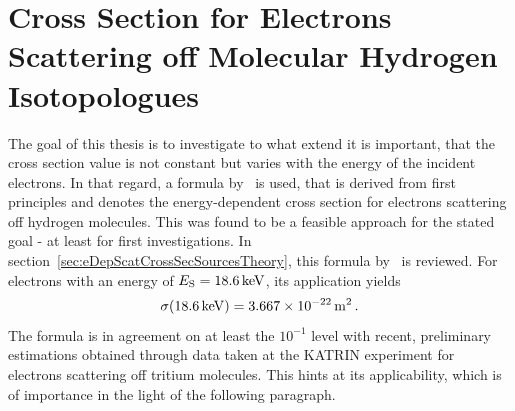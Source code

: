 \section{Cross Section for Electrons Scattering off Molecular Hydrogen Isotopologues}
\label{sec:eDepScatCrossSecSources}
The goal of this thesis is to investigate to what extend it is important, that the cross section value is not constant but varies with the energy of the incident electrons. In that regard, a formula by~\cite{Liu1987} is used, that is derived from first principles and denotes the energy-dependent cross section for electrons scattering off hydrogen molecules. This was found to be a feasible approach for the stated goal - at least for first investigations. In section~\ref{sec:eDepScatCrossSecSourcesTheory}, this formula by~\cite{Liu1987} is reviewed. For electrons with an energy of $E_\mathrm{S}=\SI{18.6}{keV}$, its application yields 
\begin{equation}
	\label{eq:eDepScatCrossSecSourcesCrossSecLiuAtEndpoint}
	\sigma(\SI{18.6}{keV}) = \SI{3.667e-22}{m^2}
	\text{\,.}
\end{equation}
The formula is in agreement on at least the $10^{-1}$ level with recent, preliminary estimations obtained through data taken at the KATRIN experiment for electrons scattering off tritium molecules. This hints at its applicability, which is of importance in the light of the following paragraph.

